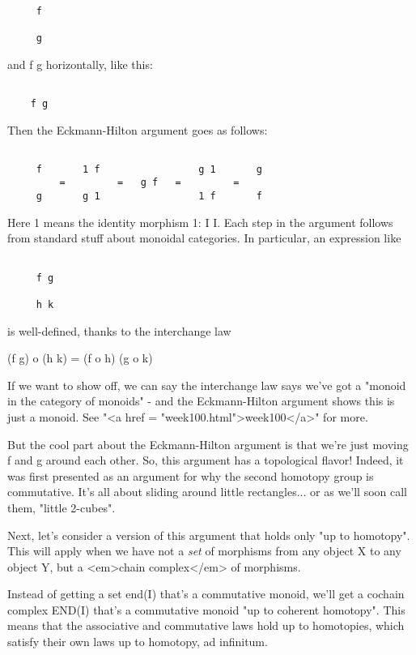 \begin{verbatim}

     f

     g
\end{verbatim}
    

and f \otimes  g horizontally, like this:


\begin{verbatim}

    f g
\end{verbatim}
    

Then the Eckmann-Hilton argument goes as follows:


\begin{verbatim}

     f       1 f                 g 1       g
         =         =   g f   =         = 
     g       g 1                 1 f       f
\end{verbatim}
    
Here 1 means the identity morphism 1: I \to  I.  Each step in the 
argument follows from standard stuff about monoidal categories.  
In particular, an expression like


\begin{verbatim}

     f g

     h k
\end{verbatim}
    

is well-defined, thanks to the interchange law

(f \otimes  g) o (h \otimes  k) = (f o h) \otimes  (g o k)

If we want to show off, we can say the interchange law says we've got
a "monoid in the category of monoids" - and the Eckmann-Hilton
argument shows this is just a monoid.  See "<a href =
"week100.html">week100</a>" for more.

But the cool part about the Eckmann-Hilton argument is that we're 
just moving f and g around each other.  So, this argument has a 
topological flavor!  Indeed, it was first presented as an argument
for why the second homotopy group is commutative.  It's all about 
sliding around little rectangles... or as we'll soon call 
them, "little 2-cubes".  

Next, let's consider a version of this argument that holds only
"up to homotopy".  This will apply when we have not a \emph{set}
of morphisms from any object X to any object Y, but a <em>chain 
complex</em> of morphisms.  

Instead of getting a set end(I) that's a commutative monoid, we'll 
get a cochain complex END(I) that's a commutative monoid "up to 
coherent homotopy".  This means that the associative and
commutative laws hold up to homotopies, which satisfy their
own laws up to homotopy, ad infinitum.


